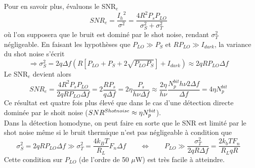 Pour en savoir plus, évaluons le SNR$_e$
\begin{equation}
SN{R_e} = \frac{{{I_h}^2}}{{{\sigma ^2}}} = \frac{{4{R^2}{P_s}{P_{LO}}}}{{\sigma _S^2 + \sigma _T^2}}
\end{equation}
où l'on supposera que le bruit est dominé par le shot noise, rendant $\sigma_T^2$ négligeable. 
En faisant les hypothèses que $P_{LO}\gg P_S$ et $RP_{LO}\gg I_{dark}$, la variance du shot noise
s'écrit
\begin{equation}
 \Rightarrow \sigma _S^2 = 2q\Delta f(R[{P_{LO}} + {P_S} + 2\sqrt {{P_{LO}}{P_S}} ] + {I_{dark}}) \approx 2qR{P_{LO}}\Delta f
\end{equation}
Le SNR$_e$ devient alors
\begin{equation}
SN{R_e} = \frac{{4{R^2}{P_s}{P_{LO}}}}{{2qR{P_{LO}}\Delta f}} = 2\frac{{R{P_s}}}{{q\Delta f}} = 2\eta \frac{{{P_s}}}{{h\nu \Delta f}} \approx \frac{{2\eta }}{{h\nu }}\frac{{N_p^{bit}h\nu 2\Delta f}}{{\Delta f}} = 4\eta N_p^{bit}
\end{equation}
Ce résultat est quatre fois plus élevé que dans le cas d'une détection directe dominée par le
shoit noise ($SN{R^{Shot{\rm{ }}noise}} \approx \eta N_p^{bit}$).\\

Dans la détection homodyne, on peut faire en sorte que le SNR est limité par le shot noise même
si le bruit thermique n'est pas négligeable à condition que
\begin{equation}
\sigma _S^2 = 2qR{P_{LO}}\Delta f \gg \sigma _T^2 = \frac{{4{k_B}T}}{{{R_L}}}{F_n}\Delta f
\qquad\Leftrightarrow\qquad  {P_{LO}} \gg \frac{{\sigma _T^2}}{{2qR\Delta f}} = \frac{{2{k_b}T{F_n}}}{{{R_L}qR}}
\end{equation}
Cette condition sur $P_{LO}$ (de l'ordre de 50 $\mu$W) est très facile à atteindre.\\

